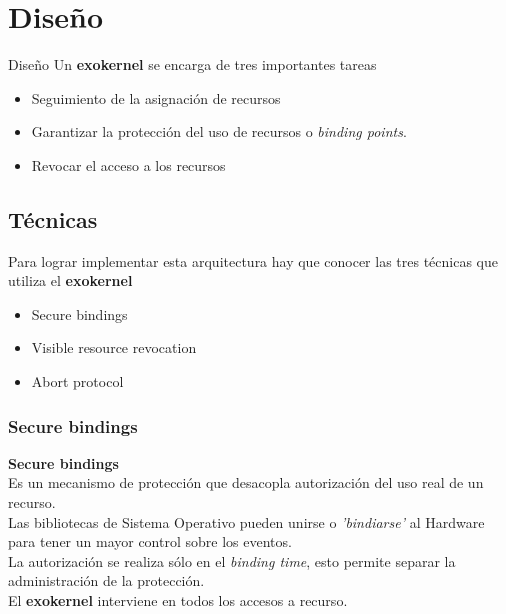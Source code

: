 \documentclass[10pt]{beamer}
\begin{document}
\section{Diseño}
\begin{frame}{Diseño}
Un \textbf{exokernel} se encarga de tres importantes tareas

\begin{itemize}
  \item Seguimiento de la asignación de recursos
  \item Garantizar la protección del uso de recursos o \textit{binding points}.
  \item Revocar el acceso a los recursos
\end{itemize}

\end{frame}


\subsection{Técnicas}
\begin{frame}
Para lograr implementar esta arquitectura hay que conocer las tres técnicas que utiliza el \textbf{exokernel} 

\begin{itemize}
  \item Secure bindings
  \item Visible resource revocation
  \item Abort protocol
\end{itemize}
\end{frame}


\subsubsection{Secure bindings}

\begin{frame}
\textbf{Secure bindings} \\[2em]

Es un mecanismo de protección que desacopla autorización del uso real de un recurso.\\[1em]

Las bibliotecas de Sistema Operativo pueden unirse o \textit{'bindiarse'} al Hardware para tener un mayor control sobre los eventos. \\[1em]  
La autorización se realiza sólo en el \textit{binding time}, esto permite separar la administración de la protección.\\[1em]

El \textbf{exokernel} interviene en todos los accesos a recurso.

\end{frame}
\end{document}
